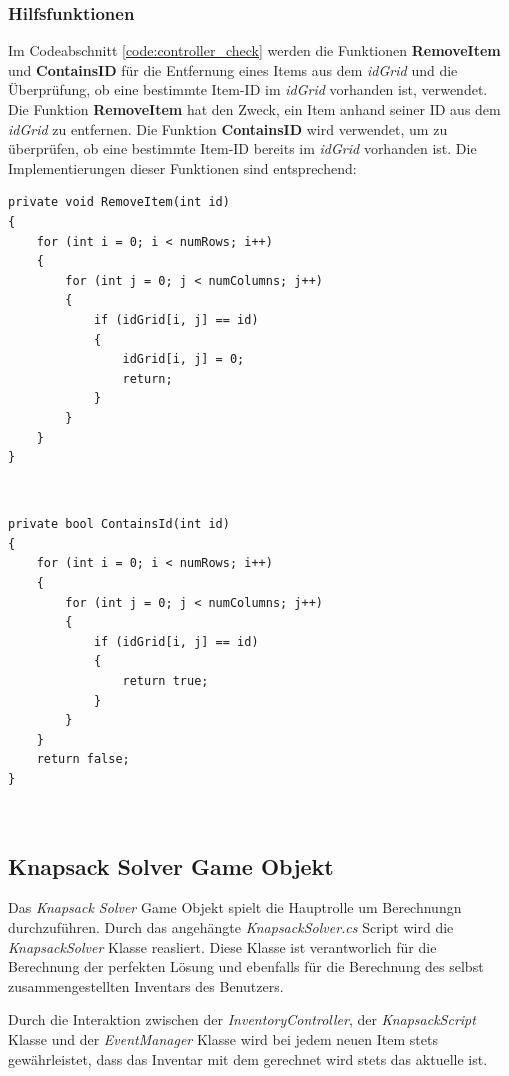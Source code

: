 \subsubsection{Hilfsfunktionen}
Im Codeabschnitt \ref{code:controller_check} werden die Funktionen \textbf{RemoveItem} und \textbf{ContainsID} für die
Entfernung eines Items aus dem \textit{idGrid} und die Überprüfung, ob eine bestimmte Item-ID im \textit{idGrid}
vorhanden ist, verwendet. Die Funktion \textbf{RemoveItem} hat den Zweck, ein Item anhand seiner ID aus dem \textit{idGrid} zu entfernen.
Die Funktion \textbf{ContainsID} wird verwendet, um zu überprüfen, ob eine bestimmte Item-ID bereits im \textit{idGrid}
vorhanden ist. Die Implementierungen dieser Funktionen sind entsprechend:
\begin{lstlisting}[style=csharp, caption={ID aus idGrid entfernen}, label=code:controller_removeID]
private void RemoveItem(int id)
{
    for (int i = 0; i < numRows; i++)
    {
        for (int j = 0; j < numColumns; j++)
        {
            if (idGrid[i, j] == id)
            {
                idGrid[i, j] = 0;
                return;
            }
        }
    }
}
\end{lstlisting}\\
\begin{lstlisting}[style=csharp, caption={Ueberpruefen ob ID in idGrid enthalten ist}, label=code:controller_contains ID]
private bool ContainsId(int id)
{
    for (int i = 0; i < numRows; i++)
    {
        for (int j = 0; j < numColumns; j++)
        {
            if (idGrid[i, j] == id)
            {
                return true;
            }
        }
    }
    return false;
}
\end{lstlisting}\\


\subsection{Knapsack Solver Game Objekt}
Das \textit{Knapsack Solver} Game Objekt spielt die Hauptrolle um Berechnungn durchzuführen.
Durch das angehängte \textit{KnapsackSolver.cs} Script wird die \textit{KnapsackSolver} Klasse reasliert. Diese
Klasse ist verantworlich für die Berechnung der perfekten Lösung und ebenfalls für die Berechnung des selbst
zusammengestellten Inventars des Benutzers.

Durch die Interaktion zwischen der \textit{InventoryController}, der \textit{KnapsackScript} Klasse und der
\textit{EventManager} Klasse wird bei jedem neuen Item stets gewährleistet, dass das Inventar mit dem gerechnet wird
stets das aktuelle ist.\\

